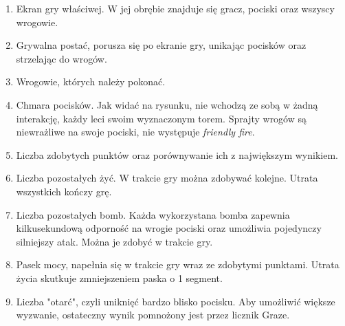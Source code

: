 	\begin{center}
		\vspace{5pt}
	\end{center}
	\begin{enumerate}
		\item Ekran gry właściwej. W jej obrębie znajduje się gracz, pociski oraz wszyscy wrogowie. 
		\item Grywalna postać, porusza się po ekranie gry, unikając pocisków oraz strzelając do wrogów.
		\item Wrogowie, których należy pokonać.
		\item Chmara pocisków. Jak widać na rysunku, nie wchodzą ze sobą w żadną interakcję, każdy leci swoim wyznaczonym torem. Sprajty wrogów są niewrażliwe na swoje pociski, nie występuje \textit{friendly fire}.
		\item Liczba zdobytych punktów oraz porównywanie ich z największym wynikiem.
		\item Liczba pozostałych żyć. W trakcie gry można zdobywać kolejne. Utrata wszystkich kończy grę.
		\item Liczba pozostałych bomb. Każda wykorzystana bomba zapewnia kilkusekundową odporność na wrogie pociski oraz umożliwia pojedynczy silniejszy atak. Można je zdobyć w trakcie gry.
		\item Pasek mocy, napełnia się w trakcie gry wraz ze zdobytymi punktami. Utrata życia skutkuje zmniejszeniem paska o 1 segment.
		\item Liczba "otarć", czyli uniknięć bardzo blisko pocisku. Aby umożliwić większe wyzwanie, ostateczny wynik pomnożony jest przez licznik Graze.
	\end{enumerate}